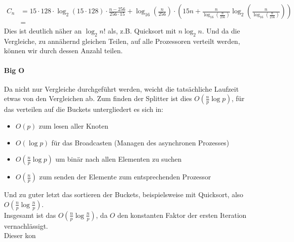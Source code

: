 			\begin{equation}
				\begin{aligned}
					C_n&=15\cdot 128\cdot\log_2\left(15\cdot 128\right)\cdot \frac{n-256}{256\cdot15}+\log_{16}\left(\frac{n}{256}\right)\cdot\left(15n+\frac{n}{\log_{16}\left(\frac{n}{256}\right)}\log_2\left(\frac{n}{\log_{16}\left(\frac{n}{256}\right)}\right)\right)\\
					&=%
				\end{aligned}
			\end{equation}
			Dies ist deutlich näher an $\log_2{n!}$ als, z.B. Quicksort mit $n\log_2{n}$. 
			Und da die Vergleiche, zu annähernd gleichen Teilen, auf alle Prozessoren verteilt werden, können wir durch dessen Anzahl teilen.
			
		\paragraph{Big O}
			Da nicht nur Vergleiche durchgeführt werden, weicht die tatsächliche Laufzeit etwas von den Vergleichen ab.
			Zum finden der Splitter ist dies $O\left(\frac{n}{p}\log{p}\right)$, für das verteilen auf die Buckets untergliedert es sich in: \autocite{wikipedia-contributors-2022}
			\begin{itemize}
				\item $O(p)$ zum lesen aller Knoten
				\item $O(\log{p})$ für das Broadcasten (Managen des asynchronen Prozesses)
				\item $O\left(\frac{n}{p}\log{p}\right)$ um binär nach allen Elementen zu suchen
				\item $O\left(\frac{n}{p}\right)$ zum senden der Elemente zum entsprechenden Prozessor
			\end{itemize}
			Und zu guter letzt das sortieren der Buckets, beispielsweise mit Quicksort, also $O\left(\frac{n}{p}\log{\frac{n}{p}}\right)$.\\
			Insgesamt ist das $O\left(\frac{n}{p}\log{\frac{n}{p}}\right)$, da $O$ den konstanten Faktor der ersten Iteration vernachlässigt.\\
			Dieser kon
			
